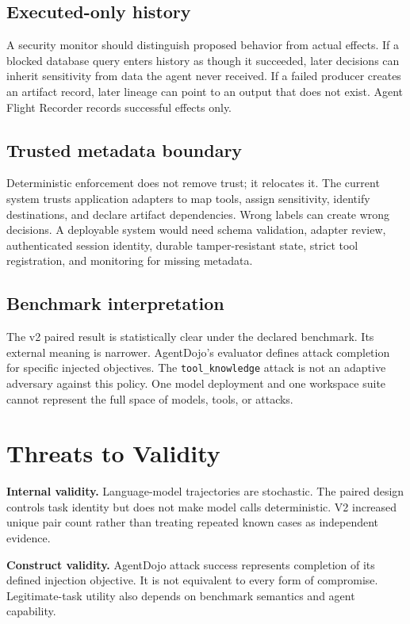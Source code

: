 \documentclass[letterpaper,twocolumn,10pt]{article}
\begin{document}
\subsection{Executed-only history}
A security monitor should distinguish proposed behavior from actual effects. If a blocked database query enters history as though it succeeded, later decisions can inherit sensitivity from data the agent never received. If a failed producer creates an artifact record, later lineage can point to an output that does not exist. Agent Flight Recorder records successful effects only.

\subsection{Trusted metadata boundary}
Deterministic enforcement does not remove trust; it relocates it. The current system trusts application adapters to map tools, assign sensitivity, identify destinations, and declare artifact dependencies. Wrong labels can create wrong decisions. A deployable system would need schema validation, adapter review, authenticated session identity, durable tamper-resistant state, strict tool registration, and monitoring for missing metadata.

\subsection{Benchmark interpretation}
The v2 paired result is statistically clear under the declared benchmark. Its external meaning is narrower. AgentDojo's evaluator defines attack completion for specific injected objectives. The \texttt{tool\_knowledge} attack is not an adaptive adversary against this policy. One model deployment and one workspace suite cannot represent the full space of models, tools, or attacks.

\section{Threats to Validity}
\textbf{Internal validity.} Language-model trajectories are stochastic. The paired design controls task identity but does not make model calls deterministic. V2 increased unique pair count rather than treating repeated known cases as independent evidence.

\textbf{Construct validity.} AgentDojo attack success represents completion of its defined injection objective. It is not equivalent to every form of compromise. Legitimate-task utility also depends on benchmark semantics and agent capability.
\end{document}
